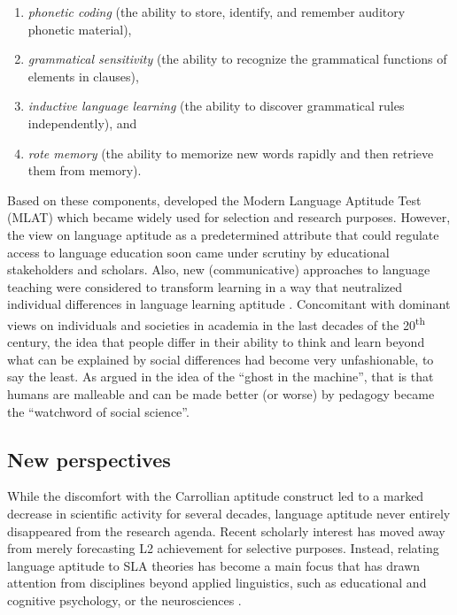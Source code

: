 \documentclass[output=paper]{langsci/langscibook}
\begin{document}
\begin{enumerate}
\item \textit{phonetic coding} (the ability to store, identify, and remember auditory phonetic material), 
\item \textit{grammatical sensitivity} (the ability to recognize the grammatical functions of elements in clauses), 
\item \textit{inductive language learning} (the ability to discover grammatical rules independently), and 
\item \textit{rote memory} (the ability to memorize new words rapidly and then retrieve them from memory). 
\end{enumerate}

Based on these components, \citet{CarrollSapon1959} developed the Modern Language Aptitude Test (MLAT) which became widely used for selection and research purposes. However, the view on language aptitude as a predetermined attribute that could regulate access to language education soon came under scrutiny by educational stakeholders and scholars. Also, new (communicative) approaches to language teaching were considered to transform learning in a way that neutralized individual differences in language learning aptitude \citep[72]{Skehan2002}. Concomitant with dominant views on individuals and societies in academia in the last decades of the 20\textsuperscript{th} century, the idea that people differ in their ability to think and learn beyond what can be explained by social differences had become very unfashionable, to say the least. As argued in \citet[28]{Pinker2003} the idea of the “ghost in the machine”, that is that humans are malleable and can be made better (or worse) by pedagogy became the “watchword of social science”.

\subsection{New perspectives} 

While the discomfort with the Carrollian aptitude construct led to a marked decrease in scientific activity for several decades, language aptitude never entirely disappeared from the research agenda. Recent scholarly interest has moved away from merely forecasting L2 achievement for selective purposes. Instead, relating language aptitude to SLA theories has become a main focus that has drawn attention from disciplines beyond applied linguistics, such as educational and cognitive psychology, or the neurosciences \citep{WenEtAl2019Researching}. 
\end{document}
